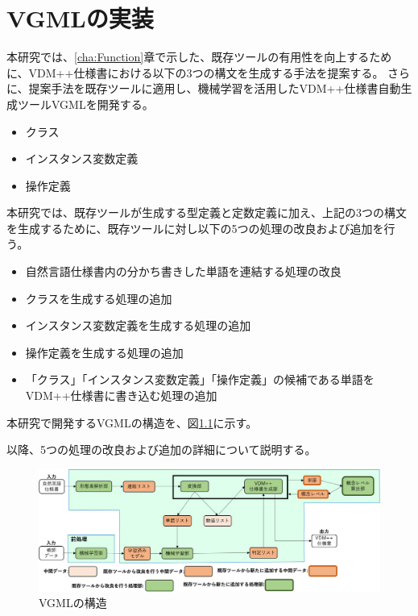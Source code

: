 \chapter{VGMLの実装}\label{cha:Implementation}

本研究では、\ref{cha:Function}章で示した、既存ツールの有用性を向上するために、VDM++仕様書における以下の3つの構文を生成する手法を提案する。
さらに、提案手法を既存ツールに適用し、機械学習を活用したVDM++仕様書自動生成ツールVGMLを開発する。

\begin{itemize}
    \item クラス
    \item インスタンス変数定義
    \item 操作定義
\end{itemize}

本研究では、既存ツールが生成する型定義と定数定義に加え、上記の3つの構文を生成するために、既存ツールに対し以下の5つの処理の改良および追加を行う。

\begin{itemize}
    \item 自然言語仕様書内の分かち書きした単語を連結する処理の改良
    \item クラスを生成する処理の追加
    \item インスタンス変数定義を生成する処理の追加
    \item 操作定義を生成する処理の追加
    \item 「クラス」「インスタンス変数定義」「操作定義」の候補である単語をVDM++仕様書に書き込む処理の追加
\end{itemize}

本研究で開発するVGMLの構造を、図\ref{fig:vgml_structure}に示す。

以降、5つの処理の改良および追加の詳細について説明する。

\begin{figure}[t]
    \begin{center}
        \includegraphics[width=1.0\columnwidth]{image/vgml_structure.png}
        \caption{VGMLの構造}
        \label{fig:vgml_structure}
    \end{center}
\end{figure}

